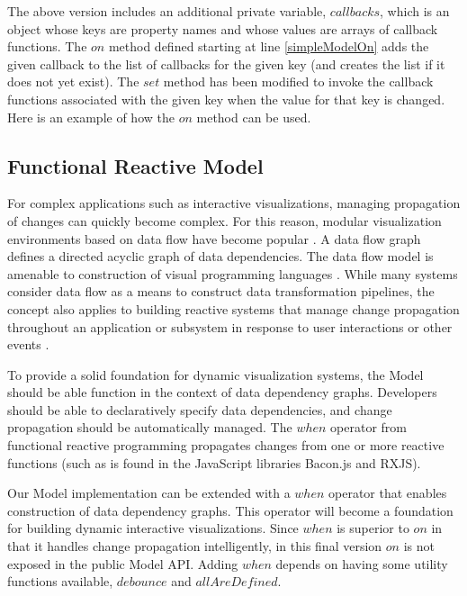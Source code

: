 The above version includes an additional private variable, $callbacks$, which is an object whose keys are property names and whose values are arrays of callback functions. The $on$ method defined starting at line \ref{simpleModelOn} adds the given callback to the list of callbacks for the given key (and creates the list if it does not yet exist). The $set$ method has been modified to invoke the callback functions associated with the given key when the value for that key is changed. Here is an example of how the $on$ method can be used.


\subsection{Functional Reactive Model}
For complex applications such as interactive visualizations, managing propagation of changes can quickly become complex. For this reason, modular visualization environments based on data flow have become popular \cite{abram1995extended}. A data flow graph defines a directed acyclic graph of data dependencies. The data flow model is amenable to construction of visual programming languages \cite{hils1992visual}. While many systems consider data flow as a means to construct data transformation pipelines, the concept also applies to building reactive systems that manage change propagation throughout an application or subsystem in response to user interactions or other events \cite{elliott1997functional}.

To provide a solid foundation for dynamic visualization systems, the Model should be able function in the context of data dependency graphs. Developers should be able to declaratively specify data dependencies, and change propagation should be automatically managed. The $when$ operator from functional reactive programming propagates changes from one or more reactive functions (such as is found in the JavaScript libraries Bacon.js and RXJS).

Our Model implementation can be extended with a $when$ operator that enables construction of data dependency graphs. This operator will become a foundation for building dynamic interactive visualizations. Since $when$ is superior to $on$ in that it handles change propagation intelligently, in this final version $on$ is not exposed in the public Model API. Adding $when$ depends on having some utility functions available, $debounce$ and $allAreDefined$.

